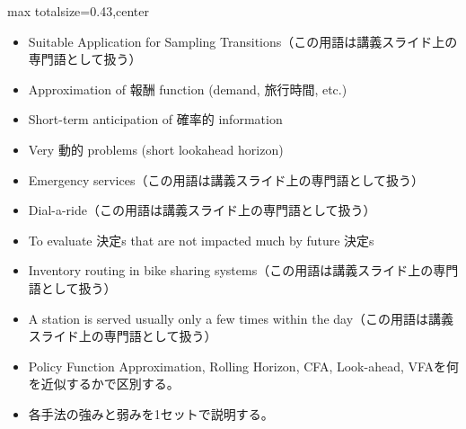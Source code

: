 \clearpage
{}
\begin{minipage}[t]{0.405\textwidth}
\begin{adjustbox}{max totalsize={\textwidth}{0.43\textheight},center}
\begin{minipage}{\textwidth}\scriptsize
{}\begin{itemize}
\item Suitable Application for Sampling Transitions（この用語は講義スライド上の専門語として扱う）
\item Approximation of 報酬 function (demand, 旅行時間, etc.)
\item Short-term anticipation of 確率的 information
\item Very 動的 problems (short lookahead horizon)
\item Emergency services（この用語は講義スライド上の専門語として扱う）
\item Dial-a-ride（この用語は講義スライド上の専門語として扱う）
\item To evaluate 決定s that are not impacted much by future 決定s
\item Inventory routing in bike sharing systems（この用語は講義スライド上の専門語として扱う）
\item A station is served usually only a few times within the day（この用語は講義スライド上の専門語として扱う）
\end{itemize}\begin{itemize}
\item Policy Function Approximation, Rolling Horizon, CFA, Look-ahead, VFAを何を近似するかで区別する。
\item 各手法の強みと弱みを1セットで説明する。
\end{itemize}
\end{minipage}
\end{adjustbox}
\end{minipage}\hfill
